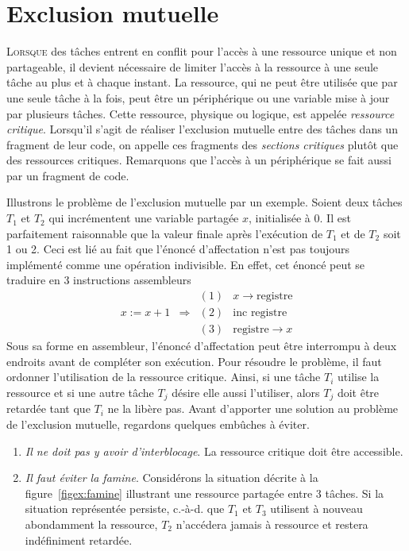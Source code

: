 \chapter{Exclusion mutuelle}
\startchapter

\lettrine[lines=3]{L}{orsque} des tâches entrent en conflit pour l'accès à une ressource unique et non partageable, il devient nécessaire de limiter l'accès à la ressource à une seule tâche au plus et à chaque instant.  La ressource, qui ne peut être utilisée que par une seule tâche à la fois, peut être un périphérique ou une variable mise à jour par plusieurs tâches. Cette ressource, physique ou logique, est appelée {\em ressource critique}. Lorsqu'il s'agit de réaliser l'exclusion mutuelle entre des tâches dans un fragment de leur code, on appelle ces fragments des {\em sections critiques} plutôt que des ressources critiques. Remarquons que l'accès à un périphérique se fait aussi par un fragment de code.
\par
Illustrons le problème de l'exclusion mutuelle par un exemple.  Soient deux tâches $T_1$ et $T_2$ qui incrémentent une variable partagée $x$, initialisée à $0$.  Il est parfaitement raisonnable que la valeur finale après l'exécution de $T_1$ et de $T_2$ soit 1 ou 2.
Ceci est lié au fait que l'énoncé d'affectation n'est pas toujours implémenté comme une opération indivisible.  En effet, cet énoncé peut se traduire en 3 instructions assembleurs
\begin{displaymath}
  \begin{array}{ccll}
           &             & (1) & x \rightarrow \mbox{registre} \\
    x:=x+1 & \Rightarrow & (2) & \mbox{inc registre}           \\
           &             & (3) & \mbox{registre} \rightarrow x
  \end{array}
\end{displaymath}
Sous sa forme en assembleur, l'énoncé d'affectation peut être interrompu à deux endroits avant de compléter son exécution.  Pour résoudre le problème, il faut ordonner l'utilisation de la ressource critique.  Ainsi, si une tâche $T_i$ utilise la ressource et si une autre tâche $T_j$ désire elle aussi l'utiliser, alors $T_j$ doit
être retardée tant que $T_i$ ne la libère pas.
\noindent
Avant d'apporter une solution au problème de l'exclusion mutuelle, regardons quelques embûches à éviter.
\begin{enumerate}
  \item {\em Il ne doit pas y avoir d'interblocage}.  La ressource critique doit être accessible.
  \item {\em Il faut éviter la famine}.  Considérons la situation décrite à la figure~\ref{figex:famine} illustrant une ressource partagée entre 3 tâches.
        Si la situation représentée persiste, c.-à-d. que $T_1$ et $T_3$ utilisent à nouveau abondamment la ressource, $T_2$ n'accédera jamais à ressource et restera indéfiniment retardée.
\end{enumerate}

